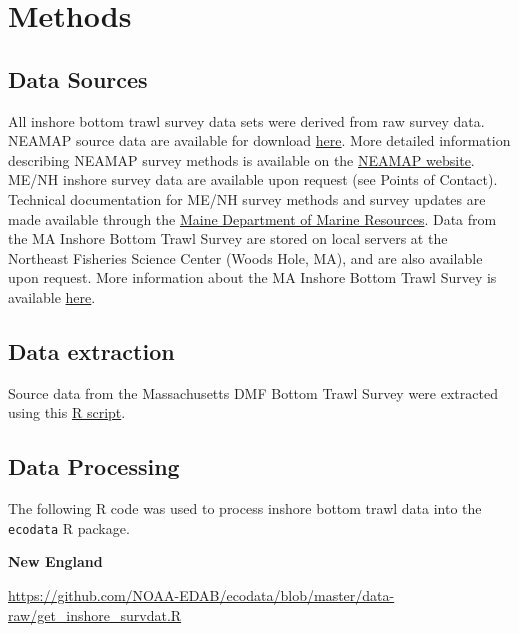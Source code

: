 \documentclass[
]{book}
\begin{document}
\hypertarget{methods-19}{%
\section{Methods}\label{methods-19}}

\hypertarget{data-sources-19}{%
\subsection{Data Sources}\label{data-sources-19}}

All inshore bottom trawl survey data sets were derived from raw survey data. NEAMAP source data are available for download \href{https://www.vims.edu/research/departments/fisheries/programs/multispecies_fisheries_research/abundance_indices/index.php}{here}. More detailed information describing NEAMAP survey methods is available on the \href{http://neamap.net}{NEAMAP website}. ME/NH inshore survey data are available upon request (see Points of Contact). Technical documentation for ME/NH survey methods and survey updates are made available through the \href{https://www.maine.gov/dmr/science-research/projects/trawlsurvey/index.html}{Maine Department of Marine Resources}. Data from the MA Inshore Bottom Trawl Survey are stored on local servers at the Northeast Fisheries Science Center (Woods Hole, MA), and are also available upon request. More information about the MA Inshore Bottom Trawl Survey is available \href{https://www.mass.gov/service-details/review-trawl-survey-updates}{here}.

\hypertarget{data-extraction-17}{%
\subsection{Data extraction}\label{data-extraction-17}}

Source data from the Massachusetts DMF Bottom Trawl Survey were extracted using this \href{https://github.com/slucey/RSurvey/blob/master/Mass_survey.R}{R script}.

\hypertarget{data-processing-14}{%
\subsection{Data Processing}\label{data-processing-14}}

The following R code was used to process inshore bottom trawl data into the \texttt{ecodata} R package.

\textbf{New England}

\url{https://github.com/NOAA-EDAB/ecodata/blob/master/data-raw/get_inshore_survdat.R}
\end{document}
